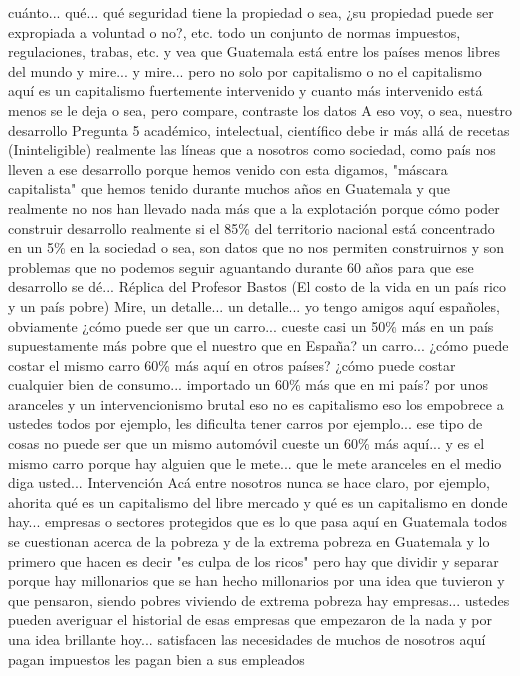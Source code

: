 cuánto... qué... qué seguridad tiene la propiedad o sea, ¿su propiedad puede ser expropiada a voluntad o no?, etc.
todo un conjunto de normas impuestos, regulaciones, trabas, etc. y vea que Guatemala
está entre los países menos libres del mundo y mire... y mire... pero no solo por capitalismo o no
el capitalismo aquí es un capitalismo fuertemente intervenido y cuanto más intervenido está menos se le deja
o sea, pero compare, contraste los datos A eso voy, o sea, nuestro desarrollo
Pregunta 5
académico, intelectual, científico debe ir más allá de recetas (Ininteligible)
realmente las líneas que a nosotros como sociedad, como país nos lleven a ese desarrollo
porque hemos venido con esta digamos, "máscara capitalista" que hemos tenido durante muchos años en Guatemala
y que realmente no nos han llevado nada más que a la explotación porque cómo poder construir desarrollo realmente si
el 85\% del territorio nacional está concentrado en un 5\% en la sociedad o sea, son datos que no nos permiten construirnos
y son problemas que no podemos seguir aguantando durante 60 años para que ese desarrollo se dé...
Réplica del Profesor Bastos (El costo de la vida en un país rico y un país pobre)
Mire, un detalle... un detalle... yo tengo amigos aquí españoles, obviamente
¿cómo puede ser que un carro... cueste casi un 50\% más en un país supuestamente más pobre
que el nuestro que en España? un carro... ¿cómo puede costar el mismo carro
60\% más aquí en otros países? ¿cómo puede costar cualquier bien de consumo... importado un 60\% más que en mi país?
por unos aranceles y un intervencionismo brutal eso no es capitalismo eso los empobrece a ustedes todos por ejemplo, les dificulta tener carros
por ejemplo... ese tipo de cosas no puede ser que un mismo automóvil cueste un 60\% más aquí...
y es el mismo carro porque hay alguien que le mete... que le mete aranceles en el medio diga usted...
Intervención
Acá entre nosotros nunca se hace claro, por ejemplo, ahorita qué es un capitalismo del libre mercado
y qué es un capitalismo en donde hay... empresas o sectores protegidos que es lo que pasa aquí en Guatemala
todos se cuestionan acerca de la pobreza y de la extrema pobreza en Guatemala y lo primero que hacen es decir
"es culpa de los ricos" pero hay que dividir y separar porque hay millonarios
que se han hecho millonarios por una idea que tuvieron y que pensaron, siendo pobres
viviendo de extrema pobreza hay empresas... ustedes pueden averiguar el historial de esas empresas
que empezaron de la nada y por una idea brillante hoy... satisfacen las necesidades
de muchos de nosotros aquí pagan impuestos les pagan bien a sus empleados
